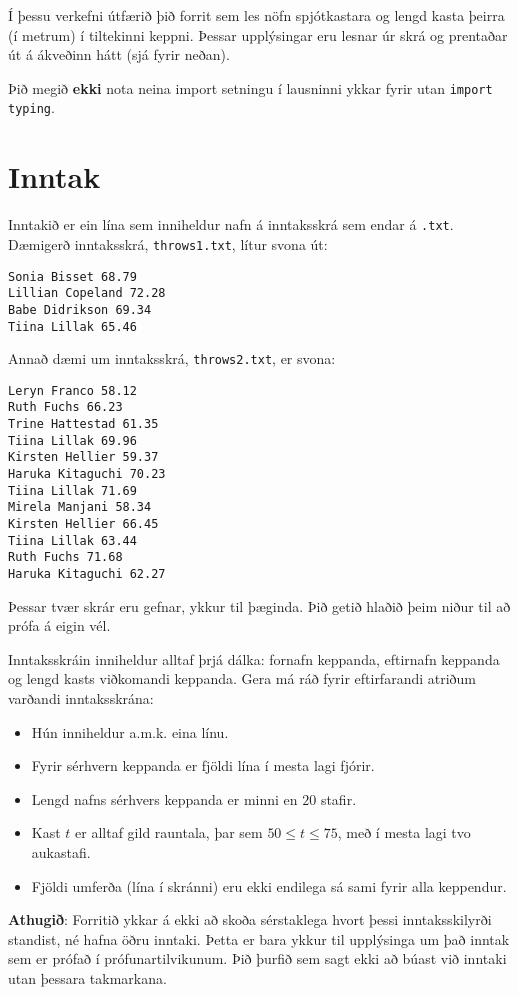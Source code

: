 
Í þessu verkefni útfærið þið forrit sem les nöfn spjótkastara og lengd kasta þeirra (í metrum) í tiltekinni keppni.
Þessar upplýsingar eru lesnar úr skrá og prentaðar út á ákveðinn hátt (sjá fyrir neðan).

\noindent
Þið megið \textbf{ekki} nota neina import setningu í lausninni ykkar fyrir utan \texttt{import typing}. \\

\section*{Inntak}
Inntakið er ein lína sem inniheldur nafn á inntaksskrá sem endar á \texttt{.txt}.
Dæmigerð inntaksskrá, \texttt{throws1.txt}, lítur svona út:
\begin{verbatim}
Sonia Bisset 68.79
Lillian Copeland 72.28
Babe Didrikson 69.34
Tiina Lillak 65.46
\end{verbatim}

Annað dæmi um inntaksskrá, \texttt{throws2.txt}, er svona:
\begin{verbatim}
Leryn Franco 58.12
Ruth Fuchs 66.23
Trine Hattestad 61.35
Tiina Lillak 69.96
Kirsten Hellier 59.37
Haruka Kitaguchi 70.23
Tiina Lillak 71.69
Mirela Manjani 58.34
Kirsten Hellier 66.45
Tiina Lillak 63.44
Ruth Fuchs 71.68
Haruka Kitaguchi 62.27
\end{verbatim}

Þessar tvær skrár eru gefnar, ykkur til þæginda.
Þið getið hlaðið þeim niður til að prófa á eigin vél.

Inntaksskráin inniheldur alltaf þrjá dálka: fornafn keppanda, eftirnafn keppanda og lengd kasts viðkomandi keppanda.
Gera má ráð fyrir eftirfarandi atriðum varðandi inntaksskrána:
\begin{itemize} 
\item Hún inniheldur a.m.k. eina línu.
\item Fyrir sérhvern keppanda er fjöldi lína í mesta lagi fjórir.
\item Lengd nafns sérhvers keppanda er minni en $20$ stafir.
\item Kast $t$ er alltaf gild rauntala, þar sem $50 \le t \le 75$, með í mesta lagi tvo aukastafi.
\item Fjöldi umferða (lína í skránni) eru ekki endilega sá sami fyrir alla keppendur.  
\end{itemize}

\textbf{Athugið}: Forritið ykkar á ekki að skoða sérstaklega hvort þessi inntaksskilyrði standist, né hafna öðru inntaki. 
Þetta er bara ykkur til upplýsinga um það inntak sem er prófað í prófunartilvikunum. 
Þið þurfið sem sagt ekki að búast við inntaki utan þessara takmarkana.


